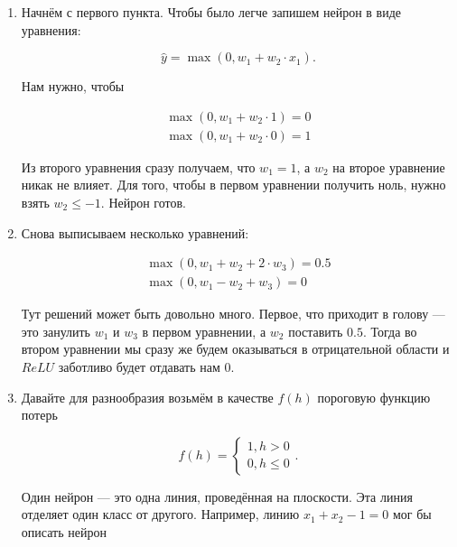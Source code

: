 \begin{sol}
\begin{enumerate}
\item Начнём с первого пункта. Чтобы было легче запишем нейрон в виде уравнения: 

$$
\hat y = \max(0, w_1 + w_2 \cdot x_1).
$$

Нам нужно, чтобы 

\begin{equation*}
\begin{aligned}
\max(0, w_1 + w_2 \cdot 1) = 0 \\ 
\max(0, w_1 + w_2 \cdot 0) = 1 
\end{aligned}
\end{equation*}

Из второго уравнения сразу получаем, что $w_1 = 1$, а $w_2$ на второе уравнение никак не влияет. Для того, чтобы в первом уравнении получить ноль, нужно взять $w_2 \le -1$. Нейрон готов. 

\item Снова выписываем несколько уравнений: 

\begin{equation*}
\begin{aligned}
\max(0, w_1 + w_2 + 2 \cdot w_3) = 0.5 \\ 
\max(0, w_1 - w_2 + w_3) = 0 
\end{aligned}
\end{equation*}

Тут решений может быть довольно много. Первое, что приходит в голову --- это занулить $w_1$ и $w_3$ в первом уравнении, а $w_2$ поставить $0.5$. Тогда во втором уравнении мы сразу же будем оказываться в отрицательной области и $ReLU$ заботливо будет отдавать нам $0$. 

\item Давайте для разнообразия возьмём в качестве $f(h)$ пороговую функцию потерь

$$
f(h) = \begin{cases} 1, h > 0 \\ 0, h \le 0 \end{cases}.
$$

Один нейрон --- это одна линия, проведённая на плоскости. Эта линия отделяет один класс от другого. Например, линию $ x_1 + x_2 - 1 = 0 $ мог бы описать нейрон 

\begin{minipage}{0.49\linewidth}
\begin{center}
\end{center}
\end{minipage}
\end{enumerate}
\end{sol}
